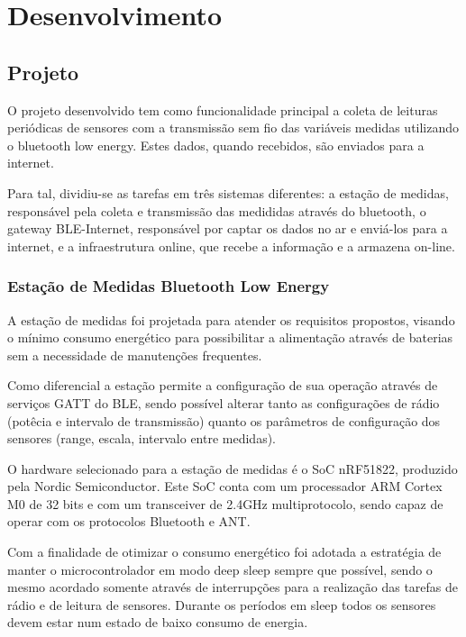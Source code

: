 \section{Desenvolvimento}

\subsection{Projeto}

O projeto desenvolvido tem como funcionalidade principal a coleta de leituras
periódicas de sensores com a transmissão sem fio das variáveis medidas
utilizando o bluetooth low energy. Estes dados, quando recebidos, são enviados
para a internet.

Para tal, dividiu-se as tarefas em três sistemas diferentes: a estação de
medidas, responsável pela coleta e transmissão das medididas através do
bluetooth, o gateway BLE-Internet, responsável por captar os dados no ar e
enviá-los para a internet, e a infraestrutura online, que recebe a informação e
a armazena on-line.

\subsubsection{Estação de Medidas Bluetooth Low Energy}

A estação de medidas foi projetada para atender os requisitos propostos,
visando o mínimo consumo energético para possibilitar a alimentação através de
baterias sem a necessidade de manutenções frequentes.
 
Como diferencial a estação permite a configuração de sua operação através de
serviços GATT do BLE, sendo possível alterar tanto as configurações de rádio
(potêcia e intervalo de transmissão) quanto os parâmetros de configuração dos
sensores (range, escala, intervalo entre medidas).

O hardware selecionado para a estação de medidas é o SoC nRF51822, produzido
pela Nordic Semiconductor. Este SoC conta com um processador ARM Cortex M0 de 32
bits e com um transceiver de 2.4GHz multiprotocolo, sendo capaz de operar com
os protocolos Bluetooth e ANT.\cite{nRF51ProdSpec}

Com a finalidade de otimizar o consumo energético foi adotada a estratégia de
manter o microcontrolador em modo deep sleep sempre que possível, sendo o mesmo
acordado somente através de interrupções para a realização das tarefas de rádio
e de leitura de sensores. Durante os períodos em sleep todos os sensores devem
estar num estado de baixo consumo de energia.

